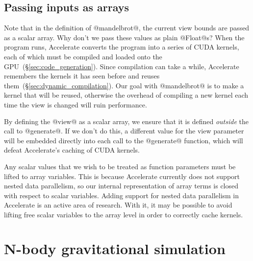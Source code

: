 \subsection{Passing inputs as arrays}

Note that in the definition of @mandelbrot@, the current view bounds are passed
as a scalar array. Why don't we pass these values as plain @Float@s? When the
program runs, Accelerate converts the program into a series of CUDA kernels,
each of which must be compiled and loaded onto the
GPU~(\S\ref{sec:code_generation}). Since compilation can take a while,
Accelerate remembers the kernels it has seen before and reuses
them~(\S\ref{sec:dynamic_compilation}). Our goal with @mandelbrot@ is to make a
kernel that will be reused, otherwise the overhead of compiling a new kernel
each time the view is changed will ruin performance.

By defining the @view@ as a scalar array, we ensure that it is defined
\emph{outside} the call to @generate@. If we don't do this, a different value
for the view parameter will be embedded directly into each call to the
@generate@ function, which will defeat Accelerate's caching of CUDA kernels.

Any scalar values that we wish to be treated as function parameters must be
lifted to array variables. This is because Accelerate currently does not support
nested data parallelism, so our internal representation of array terms is closed
with respect to scalar variables.
Adding support for nested data parallelism in Accelerate is an active area of
research. With it, it may be possible to avoid lifting free scalar variables to
the array level in order to correctly cache kernels.


\section{N-body gravitational simulation}
\label{sec:nbody}

